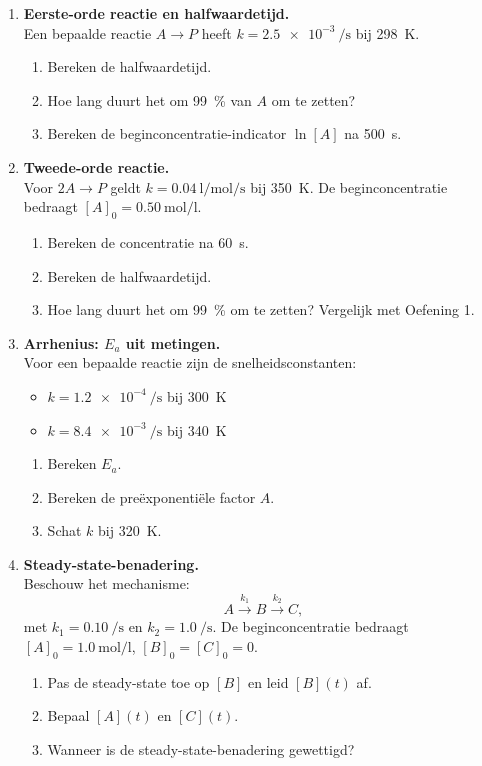 \begin{enumerate}

\item \textbf{Eerste-orde reactie en halfwaardetijd.} \\
Een bepaalde reactie $A \rightarrow P$ heeft $k = \SI{2.5e-3}{\per\second}$ bij \SI{298}{\kelvin}.
\begin{enumerate}
\item[(a)] Bereken de halfwaardetijd.
\item[(b)] Hoe lang duurt het om \SI{99}{\percent} van $A$ om te zetten?
\item[(c)] Bereken de beginconcentratie-indicator $\ln[A]$ na \SI{500}{\second}.
\end{enumerate}

\item \textbf{Tweede-orde reactie.} \\
Voor $2A \rightarrow P$ geldt $k = \SI{0.04}{\litre\per\mole\per\second}$ bij \SI{350}{\kelvin}. De beginconcentratie bedraagt $[A]_0 = \SI{0.50}{\mole\per\litre}$.
\begin{enumerate}
\item[(a)] Bereken de concentratie na \SI{60}{\second}.
\item[(b)] Bereken de halfwaardetijd.
\item[(c)] Hoe lang duurt het om \SI{99}{\percent} om te zetten? Vergelijk met Oefening 1.
\end{enumerate}

\item \textbf{Arrhenius: $E_a$ uit metingen.} \\
Voor een bepaalde reactie zijn de snelheidsconstanten:
\begin{itemize}
\item $k = \SI{1.2e-4}{\per\second}$ bij \SI{300}{\kelvin}
\item $k = \SI{8.4e-3}{\per\second}$ bij \SI{340}{\kelvin}
\end{itemize}
\begin{enumerate}
\item[(a)] Bereken $E_a$.
\item[(b)] Bereken de pre\"exponenti\"ele factor $A$.
\item[(c)] Schat $k$ bij \SI{320}{\kelvin}.
\end{enumerate}

\item \textbf{Steady-state-benadering.} \\
Beschouw het mechanisme:
\[
A \xrightarrow{k_1} B \xrightarrow{k_2} C,
\]
met $k_1 = \SI{0.10}{\per\second}$ en $k_2 = \SI{1.0}{\per\second}$. De beginconcentratie bedraagt $[A]_0 = \SI{1.0}{\mole\per\litre}$, $[B]_0 = [C]_0 = 0$.
\begin{enumerate}
\item[(a)] Pas de steady-state toe op $[B]$ en leid $[B](t)$ af.
\item[(b)] Bepaal $[A](t)$ en $[C](t)$.
\item[(c)] Wanneer is de steady-state-benadering gewettigd?
\end{enumerate}


\end{enumerate}
